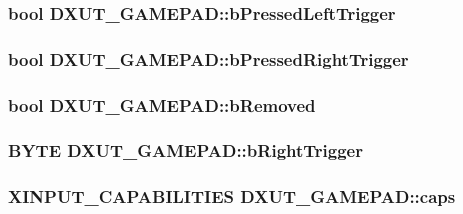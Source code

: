 \label{struct_d_x_u_t___g_a_m_e_p_a_d_afad6b4182e7931e91b32609421f49354}
\hypertarget{struct_d_x_u_t___g_a_m_e_p_a_d_aab17e716af2b0c5493c0023b0fd3d241}{
\subsubsection[{bPressedLeftTrigger}]{\setlength{\rightskip}{0pt plus 5cm}bool {\bf DXUT\_\-GAMEPAD::bPressedLeftTrigger}}}
\label{struct_d_x_u_t___g_a_m_e_p_a_d_aab17e716af2b0c5493c0023b0fd3d241}
\hypertarget{struct_d_x_u_t___g_a_m_e_p_a_d_a8e377960f2420151bc8f5adda799a6c3}{
\subsubsection[{bPressedRightTrigger}]{\setlength{\rightskip}{0pt plus 5cm}bool {\bf DXUT\_\-GAMEPAD::bPressedRightTrigger}}}
\label{struct_d_x_u_t___g_a_m_e_p_a_d_a8e377960f2420151bc8f5adda799a6c3}
\hypertarget{struct_d_x_u_t___g_a_m_e_p_a_d_a07b7bc5fd160b506c7fcb023b6f63c1a}{
\subsubsection[{bRemoved}]{\setlength{\rightskip}{0pt plus 5cm}bool {\bf DXUT\_\-GAMEPAD::bRemoved}}}
\label{struct_d_x_u_t___g_a_m_e_p_a_d_a07b7bc5fd160b506c7fcb023b6f63c1a}
\hypertarget{struct_d_x_u_t___g_a_m_e_p_a_d_aeb5863b24560130cbdad6f78701bffa3}{
\subsubsection[{bRightTrigger}]{\setlength{\rightskip}{0pt plus 5cm}BYTE {\bf DXUT\_\-GAMEPAD::bRightTrigger}}}
\label{struct_d_x_u_t___g_a_m_e_p_a_d_aeb5863b24560130cbdad6f78701bffa3}
\hypertarget{struct_d_x_u_t___g_a_m_e_p_a_d_adb9683d085018a0e2b3b23520b897eab}{
\subsubsection[{caps}]{\setlength{\rightskip}{0pt plus 5cm}XINPUT\_\-CAPABILITIES {\bf DXUT\_\-GAMEPAD::caps}}}
